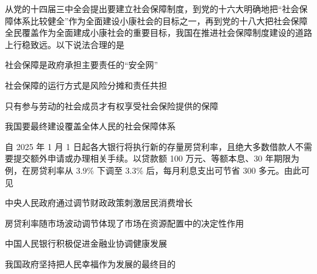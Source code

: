 \documentclass{exam-zh}
\begin{document}
\begin{question}
  从党的十四届三中全会提出要建立社会保障制度，到党的十六大明确地把“社会保障体系比较健全”作为全面建设小康社会的目标之一，再到党的十八大把社会保障全民覆盖作为全面建成小康社会的重要目标，我国在推进社会保障制度建设的道路上行稳致远。以下说法合理的是

   社会保障是政府承担主要责任的“安全网”

   社会保障的运行方式是风险分摊和责任共担

   只有参与劳动的社会成员才有权享受社会保险提供的保障

   我国要最终建设覆盖全体人民的社会保障体系

  \begin{choices}
  \item {}
  \item {}
  \item {}
  \item {}
  \end{choices}
\end{question}

\begin{question}
  自 2025 年 1 月 1 日起各大银行将执行新的存量房贷利率，且绝大多数借款人不需要提交额外申请或办理相关手续。以贷款额 100 万元、等额本息、30 年期限为例，在房贷利率从 3.9\% 下调至 3.3\% 后，每月利息支出可节省 300 多元。由此可见

   中央人民政府通过调节财政政策刺激居民消费增长

   房贷利率随市场波动调节体现了市场在资源配置中的决定性作用

   中国人民银行积极促进金融业协调健康发展

   我国政府坚持把人民幸福作为发展的最终目的

  \begin{choices}
  \item {}
  \item {}
  \item {}
  \item {}
  \end{choices}
\end{question}
\end{document}
